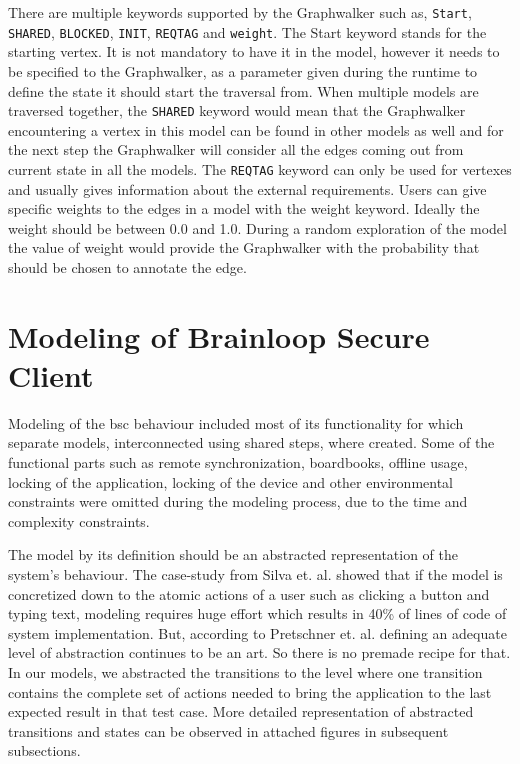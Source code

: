 \par
There are multiple keywords supported by the Graphwalker such as, \texttt{Start}, \texttt{SHARED}, \texttt{BLOCKED}, \texttt{INIT}, \texttt{REQTAG} and \texttt{weight}. The Start keyword stands for the starting vertex. It is not mandatory to have it in the model, however it needs to be specified to the Graphwalker, as a parameter given during the runtime to define the state it should start the traversal from. When multiple models are traversed together, the \texttt{SHARED} keyword would mean that the Graphwalker encountering a vertex in this model can be found in other models as well and for the next step the Graphwalker will consider all the edges coming out from current state in all the models. The \texttt{REQTAG} keyword can only be used for vertexes and usually gives information about the external requirements. Users can give specific weights to the edges in a model with the weight keyword. Ideally the weight should be between 0.0 and 1.0. During a random exploration of the model the value of weight would provide the Graphwalker with the probability that should be chosen to annotate the edge.

\section{Modeling of Brainloop Secure Client}

\par
Modeling of the \acrshort{bsc} behaviour included  most of its functionality for which separate models, interconnected using shared steps, where created. Some of the functional parts such as remote synchronization, boardbooks, offline usage, locking of the application, locking of the device and other environmental constraints were omitted during the modeling process, due to the time and complexity constraints.

\par
The model by its definition should be an abstracted representation of the system's behaviour.
The case-study from Silva et. al. \cite{Silva_SpecExplorer} showed that if the model is concretized down to the atomic actions of a user such as clicking a button and typing text, modeling requires huge effort which results in 40\% of lines of code of system implementation. But, according to Pretschner et. al. \cite{Pretschner_MBTInPractice} defining an adequate level of abstraction continues to be an art. So there is no premade recipe for that. In our models, we abstracted the transitions to the level where one transition contains the complete set of actions needed to bring the application to the last expected result in that test case. More detailed representation of abstracted transitions and states can be observed in attached figures in subsequent subsections.

